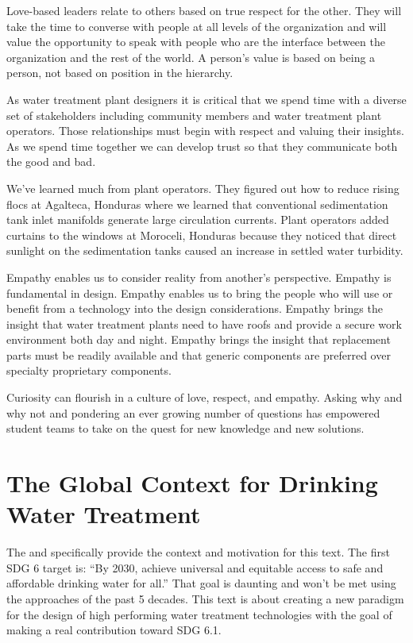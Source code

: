 \documentclass[letterpaper,10pt,english]{sphinxmanual}
\begin{document}
Love-based leaders relate to others based on true respect for the other. They will take the time to converse with people at all levels of the organization and will value the opportunity to speak with people who are the interface between the organization and the rest of the world. A person’s value is based on being a person, not based on position in the hierarchy.

As water treatment plant designers it is critical that we spend time with a diverse set of stakeholders including community members and water treatment plant operators. Those relationships must begin with respect and valuing their insights. As we spend time together we can develop trust so that they communicate both the good and bad.

We’ve learned much from plant operators. They figured out how to reduce rising flocs at Agalteca, Honduras where we learned that conventional sedimentation tank inlet manifolds generate large circulation currents. Plant operators added curtains to the windows at Moroceli, Honduras because they noticed that direct sunlight on the sedimentation tanks caused an increase in settled water turbidity.

Empathy enables us to consider reality from another’s perspective. Empathy is fundamental in design. Empathy enables us to bring the people who will use or benefit from a technology into the design considerations. Empathy brings the insight that water treatment plants need to have roofs and provide a secure work environment both day and night. Empathy brings the insight that replacement parts must be readily available and that generic components are preferred over specialty proprietary components.

Curiosity can flourish in a culture of love, respect, and empathy. Asking why and why not and pondering an ever growing number of questions has empowered student teams to take on the quest for new knowledge and new solutions.


\section{The Global Context for Drinking Water Treatment}
\label{\detokenize{Introduction/Introduction:the-global-context-for-drinking-water-treatment}}\label{\detokenize{Introduction/Introduction:heading-the-global-context-for-drinking-water-treatment}}
The  and specifically  provide the context and motivation for this text. The first SDG 6 target is: “By 2030, achieve universal and equitable access to safe and affordable drinking water for all.” That goal is daunting and won’t be met using the approaches of the past 5 decades. This text is about creating a new paradigm for the design of high performing water treatment technologies with the goal of making a real contribution toward SDG 6.1.
\end{document}
